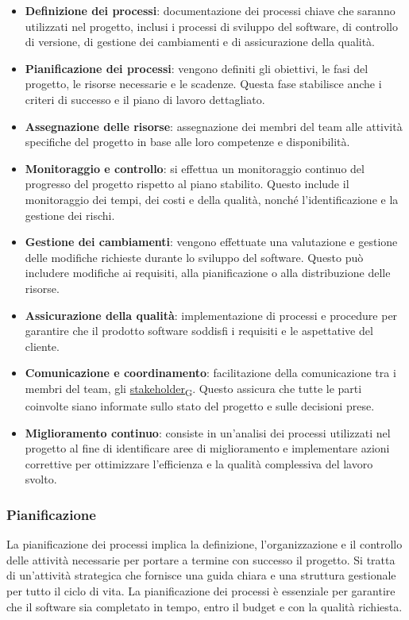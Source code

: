 \begin{itemize}
    \item \textbf{Definizione dei processi}: documentazione dei processi chiave che saranno utilizzati nel progetto, inclusi i processi di sviluppo del software, di controllo di versione, di gestione dei cambiamenti e di assicurazione della qualità.
    \item \textbf{Pianificazione dei processi}: vengono definiti gli obiettivi, le fasi del progetto, le risorse necessarie e le scadenze. Questa fase stabilisce anche i criteri di successo e il piano di lavoro dettagliato.
    \item \textbf{Assegnazione delle risorse}: assegnazione dei membri del team alle attività specifiche del progetto in base alle loro competenze e disponibilità.
    \item \textbf{Monitoraggio e controllo}: si effettua un monitoraggio continuo del progresso del progetto rispetto al piano stabilito. Questo include il monitoraggio dei tempi, dei costi e della qualità, nonché l'identificazione e la gestione dei rischi.
    \item \textbf{Gestione dei cambiamenti}: vengono effettuate una valutazione e gestione delle modifiche richieste durante lo sviluppo del software. Questo può includere modifiche ai requisiti, alla pianificazione o alla distribuzione delle risorse.
    \item \textbf{Assicurazione della qualità}: implementazione di processi e procedure per garantire che il prodotto software soddisfi i requisiti e le aspettative del cliente.
    \item \textbf{Comunicazione e coordinamento}: facilitazione della comunicazione tra i membri del team, gli \href{https://7last.github.io/docs/pb/documentazione-interna/glossario\#stakeholder}{stakeholder\textsubscript{G}}. Questo assicura che tutte le parti coinvolte siano informate sullo stato del progetto e sulle decisioni prese.
    \item \textbf{Miglioramento continuo}: consiste in un'analisi dei processi utilizzati nel progetto al fine di identificare aree di miglioramento e implementare azioni correttive per ottimizzare l'efficienza e la qualità complessiva del lavoro svolto.
\end{itemize}

\subsubsection{Pianificazione}
La pianificazione dei processi implica la definizione, l'organizzazione e il controllo delle attività necessarie per portare a termine con successo il progetto. Si tratta di un'attività strategica che fornisce una guida chiara e una struttura gestionale per tutto il ciclo di vita. La pianificazione dei processi è essenziale per garantire che il software sia completato in tempo, entro il budget e con la qualità richiesta.

